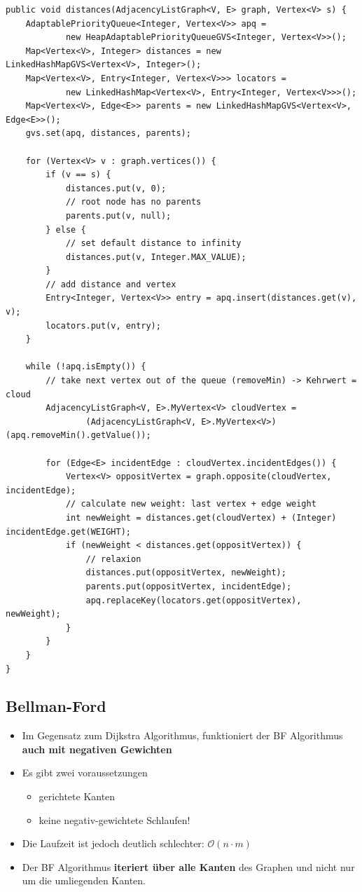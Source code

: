 \begin{lstlisting}[caption=Dijkstra Algorithmus]
public void distances(AdjacencyListGraph<V, E> graph, Vertex<V> s) {
	AdaptablePriorityQueue<Integer, Vertex<V>> apq = 
			new HeapAdaptablePriorityQueueGVS<Integer, Vertex<V>>();
	Map<Vertex<V>, Integer> distances = new LinkedHashMapGVS<Vertex<V>, Integer>();
	Map<Vertex<V>, Entry<Integer, Vertex<V>>> locators =
			new LinkedHashMap<Vertex<V>, Entry<Integer, Vertex<V>>>();
	Map<Vertex<V>, Edge<E>> parents = new LinkedHashMapGVS<Vertex<V>, Edge<E>>();
	gvs.set(apq, distances, parents);
	
	for (Vertex<V> v : graph.vertices()) {
		if (v == s) {
			distances.put(v, 0);
			// root node has no parents
			parents.put(v, null);
		} else {
			// set default distance to infinity
			distances.put(v, Integer.MAX_VALUE);
		}
		// add distance and vertex
		Entry<Integer, Vertex<V>> entry = apq.insert(distances.get(v), v);
		locators.put(v, entry);
	}

	while (!apq.isEmpty()) {
		// take next vertex out of the queue (removeMin) -> Kehrwert =  cloud
		AdjacencyListGraph<V, E>.MyVertex<V> cloudVertex = 
				(AdjacencyListGraph<V, E>.MyVertex<V>) (apq.removeMin().getValue());
				
		for (Edge<E> incidentEdge : cloudVertex.incidentEdges()) {
			Vertex<V> oppositVertex = graph.opposite(cloudVertex, incidentEdge);
			// calculate new weight: last vertex + edge weight
			int newWeight = distances.get(cloudVertex) + (Integer) incidentEdge.get(WEIGHT);
			if (newWeight < distances.get(oppositVertex)) {
				// relaxion
				distances.put(oppositVertex, newWeight);
				parents.put(oppositVertex, incidentEdge);
				apq.replaceKey(locators.get(oppositVertex), newWeight);
			}
		}
	}
}
\end{lstlisting}

\clearpage

\subsection{Bellman-Ford}
\begin{itemize}
	\item Im Gegensatz zum Dijkstra Algorithmus, funktioniert der BF Algorithmus \textbf{auch mit negativen Gewichten}
	\item Es gibt zwei voraussetzungen
	\begin{itemize}
		\item gerichtete Kanten
		\item keine negativ-gewichtete Schlaufen!
	\end{itemize}
	\item Die Laufzeit ist jedoch deutlich schlechter: $\mathcal{O}(n\cdot m)$
	\item Der BF Algorithmus \textbf{iteriert über alle Kanten} des Graphen und nicht nur um die umliegenden Kanten.
\end{itemize}

